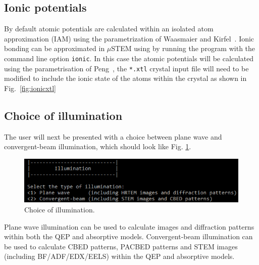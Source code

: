 \documentclass[12pt,a4paper]{article}
\begin{document}
\subsection{Ionic potentials}
%
By default atomic potentials are calculated within an isolated atom approximation (IAM) using the parametrization of Waasmaier and Kirfel~\cite{WK1}. Ionic bonding can be approximated in $\mu$STEM using by running the program with the command line option \texttt{ionic}. In this case the atomic potentials will be calculated using the parametrisation of Peng~\cite{peng1998electron}, the \texttt{*.xtl} crystal input file will need to be modified to include the ionic state of the atoms within the crystal as shown in Fig.~\ref{fig:ionicxtl}
%


\subsection{Choice of illumination}

The user will next be presented with a choice between plane wave and convergent-beam illumination, which should look like Fig. \ref{fig:illum_choice}.

\begin{figure}[!h]
\begin{center}
    \includegraphics[scale=0.75]{figures/illumination_choice.png}
\caption{Choice of illumination.}
\label{fig:illum_choice}
\end{center}
\end{figure}

Plane wave illumination can be used to calculate images and diffraction patterns within both the QEP and absorptive models.
Convergent-beam illumination can be used to calculate CBED patterns, PACBED patterns and STEM images (including BF/ADF/EDX/EELS) within the QEP and absorptive models.
\end{document}
